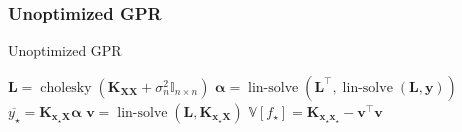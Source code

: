 \documentclass[9pt,hyperref={pdfpagelabels=false},xcolor=table]{beamer}
\begin{document}
\begin{frame}
    \frametitle{Unoptimized GPR}
    {\centering
        \begin{minipage}{.9\linewidth}
            \begin{algorithm}[H]
                \caption{Unoptimized GPR}
                \SetAlgoLined
                \DontPrintSemicolon

                \BlankLine
                $\bm{L} = \operatorname{cholesky} \left( \bm{K_{XX}} + \sigma_n^2 \mathbb{I}_{n \times n} \right)$\;
                $\bm{\alpha} = \operatorname{lin-solve} \left( \bm{L}^{\intercal} , \operatorname{lin-solve} \left( \bm{L}, \bm{y} \right) \right)$\;
                $\overline{y_{\star}} = \bm{K_{x_{\star} X}} \bm{\alpha}$\;
                $\bm{v} = \operatorname{lin-solve} \left( \bm{L}, \bm{K_{x_{\star} X}} \right)$\;
                $\mathbb{V} \left[ f_{\star} \right] = \bm{K_{x_{\star} x_{\star}}} - \bm{v}^{\intercal} \bm{v}$\;
                \BlankLine
            \end{algorithm}
        \end{minipage}
        \par
    }
\end{frame}
\end{document}
